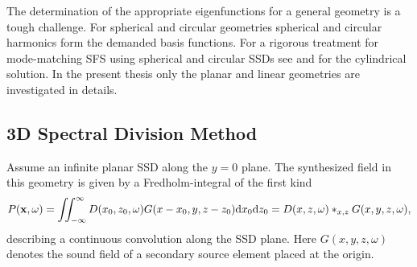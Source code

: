 The determination of the appropriate eigenfunctions for a general geometry is a tough challenge.
For spherical and circular geometries spherical and circular harmonics form the demanded basis functions. For a rigorous treatment for mode-matching SFS using spherical and circular SSDs see \cite{Ahrens2010phd,Zotter2009phd,Ahrens2012,Ahrens2009:circularSSD_mismatch,Ahrens2009:circular25D_SFR,Ahrens2008:Analytical_Circ_Spherical_SFS,Schultz2014:Comparing_approaches} and \cite{Koyama2014} for the cylindrical solution.
In the present thesis only the planar and linear geometries are investigated in details.
 
\subsection{3D Spectral Division Method}
Assume an infinite planar SSD along the $y = 0$ plane.
The synthesized field in this geometry is given by a Fredholm-integral of the first kind 
\begin{equation}
P(\mathbf{x},\omega) = \iint_{-\infty}^{\infty} D(x_0,z_0,\omega) G(x-x_0,y,z-z_0) \mathrm{d} x_0 \mathrm{d} z_0 = D(x,z,\omega)\ast_{x,z} G(x,y,z,\omega),
\end{equation}
describing a continuous convolution along the SSD plane.
Here $G(x,y,z,\omega)$ denotes the sound field of a secondary source element placed at the origin.

